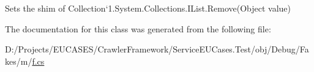 Sets the shim of Collection`1.System.\-Collections.\-I\-List.\-Remove(\-Object value)



The documentation for this class was generated from the following file\-:\begin{DoxyCompactItemize}
\item 
D\-:/\-Projects/\-E\-U\-C\-A\-S\-E\-S/\-Crawler\-Framework/\-Service\-E\-U\-Cases.\-Test/obj/\-Debug/\-Fakes/m/\hyperlink{m_2f_8cs}{f.\-cs}\end{DoxyCompactItemize}

